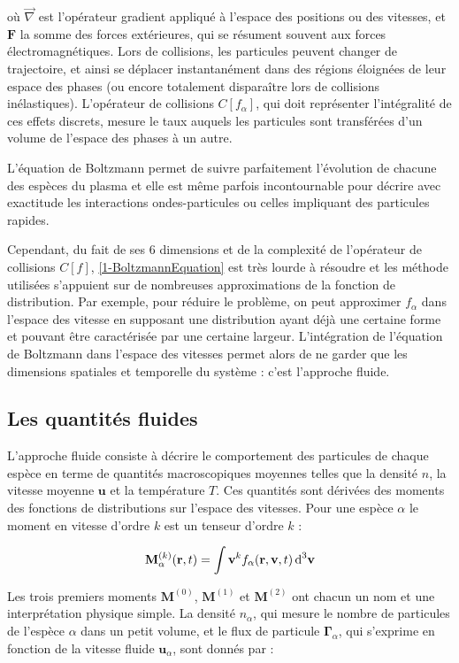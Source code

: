 \begin{refsection}
où $\vec\nabla$ est l'opérateur gradient appliqué à l'espace des positions ou
des vitesses, et $\mathbf{F}$ la somme des forces extérieures, qui se résument
souvent aux forces électromagnétiques. Lors de collisions, les particules peuvent changer de
trajectoire, et ainsi se déplacer instantanément dans des régions éloignées de leur espace des
phases (ou encore totalement disparaître lors de collisions inélastiques).
L'opérateur de collisions $C[f_\alpha]$, qui doit représenter l'intégralité de
ces effets discrets, mesure le taux auquels les particules sont transférées d'un
volume de l'espace des phases à un autre.

 L'équation de Boltzmann permet de
suivre parfaitement l'évolution de chacune des espèces du plasma et elle est
même parfois incontournable pour décrire avec exactitude les interactions
ondes-particules ou celles impliquant des particules rapides. 

Cependant, du fait de ses 6 dimensions et de la complexité de
l'opérateur de collisions $C[f]$, \eqref{1-BoltzmannEquation} est très
lourde à résoudre et les méthode utilisées
s'appuient sur de nombreuses approximations de la fonction de
distribution\parencite{HagelaarHDR}. Par exemple, pour réduire le problème, on
peut approximer $f_\alpha$ dans l'espace des vitesse en supposant une
distribution ayant déjà une certaine forme et pouvant être caractérisée par une
certaine largeur. L'intégration de l'équation de Boltzmann dans l'espace des
vitesses permet alors de ne garder que les dimensions spatiales et temporelle
du système : c'est l'approche fluide.

\subsection{Les quantités fluides}
L'approche fluide consiste à décrire le comportement des particules de chaque
espèce en terme de quantités macroscopiques moyennes telles que la densité $n$,
la vitesse moyenne $\mathbf u$ et la température $T$. Ces quantités sont dérivées
des moments des fonctions de distributions sur l'espace des vitesses.
Pour une espèce $\alpha$ le moment en vitesse d'ordre $k$ est un tenseur d'ordre
$k$ :

\begin{equation}
\mathbf M^{(k)}_\alpha(\mathbf
r,t)=\int\mathbf{v}^k f_\alpha(\mathbf r,\mathbf v,t)
\,\text{d}^{{3}}\mathbf{v}
\end{equation}

Les trois premiers moments $\mathbf M^{(0)}$, $\mathbf M^{(1)}$ et $\mathbf
M^{(2)}$ ont chacun un nom et une interprétation physique simple. La densité
$n_\alpha$, qui mesure le nombre de particules de l'espèce $\alpha$ dans un
petit volume, et le flux de particule $\boldsymbol{\Gamma}_\alpha$, qui
s'exprime en fonction de la vitesse fluide $\mathbf u_\alpha$, sont
donnés par :


\end{refsection}
